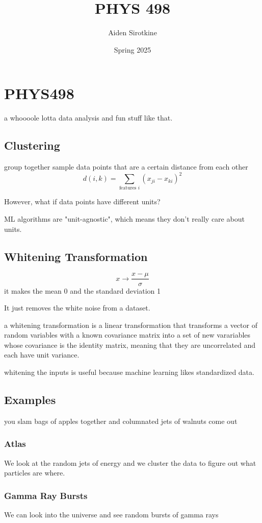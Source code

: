 \documentclass[fleqn]{report}
\date{Spring 2025}
\title{PHYS 498}
\author{Aiden Sirotkine}
\begin{document}
\pagestyle{fancy}
\maketitle
\tableofcontents
\clearpage

\chapter{PHYS498}
a whoooole lotta data analysis and fun stuff like that. 

\section{Clustering}
group together sample data points that are a certain distance from each other 
\[
d(i, k) = \sum\limits_{\textrm{features } i} (x_{ji} - x_{ki})^2
\]

However, what if data points have different units?

ML algorithms are "unit-agnostic", which means they don't really care about units. 

\section{Whitening Transformation}
\[
x \rightarrow \frac{x - \mu}{\sigma}
\]
it makes the mean 0 and the standard deviation 1

It just removes the white noise from a dataset. 

a whitening transformation is a linear transformation that 
transforms a vector of random variables with a known covariance matrix 
into a set of new varariables whose covariance is the identity matrix, 
meaning that they are uncorrelated and each have unit variance. 

whitening the inputs is useful because machine learning likes standardized data. 

\section{Examples}
you slam bags of apples together and columnated jets of walnuts come out 

\subsection{Atlas}
We look at the random jets of energy and we cluster the data to figure out 
what particles are where. 

\subsection{Gamma Ray Bursts}
We can look into the universe and see random bursts of gamma rays 
\end{document}
